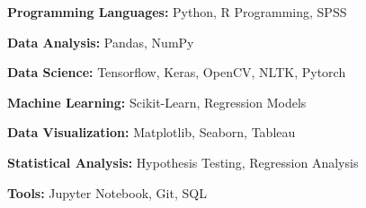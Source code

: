 \documentclass{article}
\renewcommand{\labelitemii}{
        $\vcenter{\hbox{\tiny$\bullet$}}$\hspace*{-3pt}
        }
\newenvironment{bullet-list-major}{
          \begin{list}{\labelitemii}{\setlength\leftmargin{3pt} 
          \topsep 0pt \itemsep -2pt}}{\vspace*{4pt}\end{list}
          }
\begin{document}
      {
        \begin{bullet-list-major}
        \item \textbf{Programming Languages:} Python, R Programming, SPSS
        \end{bullet-list-major}
        

        \begin{bullet-list-major}
        \item \textbf{Data Analysis:} Pandas, NumPy
        \end{bullet-list-major}
        

        \begin{bullet-list-major}
        \item \textbf{Data Science:} Tensorflow, Keras, OpenCV, NLTK, Pytorch
        \end{bullet-list-major}
        

        \begin{bullet-list-major}
        \item \textbf{Machine Learning:} Scikit-Learn, Regression Models
        \end{bullet-list-major}
        

        \begin{bullet-list-major}
        \item \textbf{Data Visualization:} Matplotlib, Seaborn, Tableau
        \end{bullet-list-major}
        

        \begin{bullet-list-major}
        \item \textbf{Statistical Analysis:} Hypothesis Testing, Regression Analysis
        \end{bullet-list-major}
        

        \begin{bullet-list-major}
        \item \textbf{Tools:} Jupyter Notebook, Git, SQL
        \end{bullet-list-major}
        }
  
\end{document}
